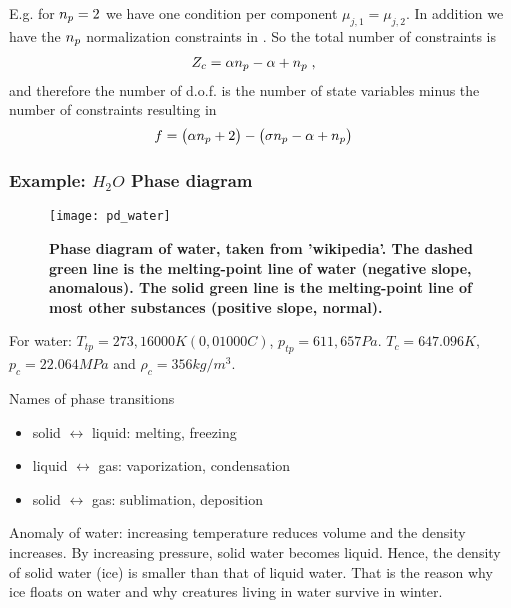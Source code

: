 E.g. for $n_{p} =2$ we have one condition per component $\mu_{j,1}=\mu_{j,2}$.
In addition we have the $n_{p} $ normalization constraints in .
So the total number of constraints is 
%
\begin{align*}
Z_{c} &= \alpha n_{p} -\alpha + n_{p} \;,
\end{align*}
%
and therefore the number of d.o.f. is the number of state variables minus the number of constraints
resulting in 
%
\begin{align*}
f &=\big( \alpha n_{p} +2\big) - \big(\sigma n_{p} -\alpha+n_{p} \big)
\end{align*}
%
%
%
\newpage 

\subsubsection{Example: $H_{2}O$ Phase diagram}
\begin{figure}[htbp]
\begin{center}
\texttt{[image: pd\_water]}
\caption{\bf Phase diagram of water, taken from 'wikipedia'. The dashed green line
is the melting-point line of water (negative slope, anomalous). The solid green line is the melting-point line of most other substances (positive slope, normal).}
\end{center}
\end{figure}


For water:
$T_{tp}=273,16000 K (0,01000 C)$, $p_{tp}=611,657 Pa$.
$T_{c} = 647.096 K$, $p_{c} = 22.064 MPa$ and $\rho_{c} = 356 kg/m^{3}$.

Names of phase transitions
\begin{itemize}
	\item solid $\leftrightarrow$ liquid: melting, freezing 
 	\item liquid $\leftrightarrow$ gas:  vaporization, condensation
 	\item solid $\leftrightarrow$ gas: sublimation, deposition
\end{itemize}

Anomaly of water: increasing temperature reduces volume and the density increases. By increasing 
pressure, solid water becomes liquid. Hence, the density of solid water (ice) is smaller than that of liquid water. That is the reason why ice floats on water and why  creatures living in water  survive in winter.

